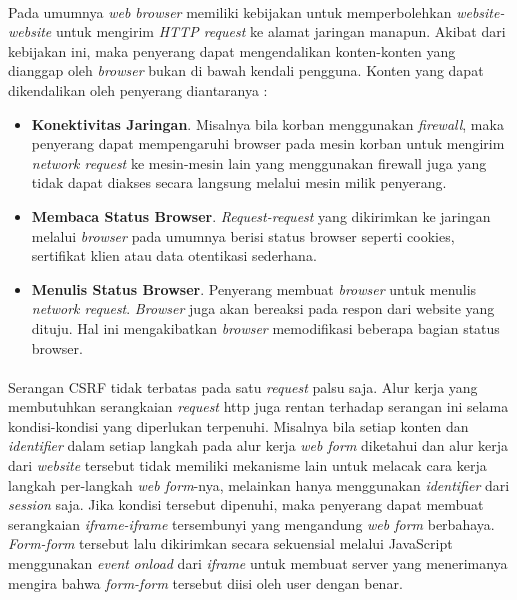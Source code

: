 \paragraph{}Pada umumnya \textit{web browser} memiliki kebijakan untuk memperbolehkan \textit{website-website} untuk mengirim \textit{HTTP request} ke alamat jaringan manapun. Akibat dari kebijakan ini, maka penyerang dapat mengendalikan konten-konten yang dianggap oleh \textit{browser} bukan di bawah kendali pengguna. Konten yang dapat dikendalikan oleh penyerang diantaranya :
\begin{itemize}
	\item \textbf{Konektivitas Jaringan}. Misalnya bila korban menggunakan \textit{firewall}, maka penyerang dapat mempengaruhi browser pada mesin korban untuk mengirim \textit{network request} ke mesin-mesin lain yang menggunakan firewall juga yang tidak dapat diakses secara langsung melalui mesin milik penyerang.
	\item \textbf{Membaca Status Browser}. \textit{Request-request} yang dikirimkan ke jaringan melalui \textit{browser} pada umumnya berisi status browser seperti cookies, sertifikat klien atau data otentikasi sederhana.
	\item\textbf{ Menulis Status Browser}. Penyerang membuat \textit{browser} untuk menulis \textit{network request}. \textit{Browser} juga akan bereaksi pada respon dari website yang dituju. Hal ini mengakibatkan \textit{browser} memodifikasi beberapa bagian status browser.
\end{itemize}

\paragraph{}Serangan CSRF tidak terbatas pada satu \textit{request} palsu saja. Alur kerja yang membutuhkan serangkaian \textit{request} http juga rentan terhadap serangan ini selama kondisi-kondisi yang diperlukan terpenuhi. Misalnya bila setiap konten dan \textit{identifier} dalam setiap langkah pada alur kerja \textit{web form} diketahui dan alur kerja dari \textit{website} tersebut tidak memiliki mekanisme lain untuk melacak cara kerja langkah per-langkah \textit{web form}-nya, melainkan hanya menggunakan \textit{identifier} dari \textit{session} saja. Jika kondisi tersebut dipenuhi, maka penyerang dapat membuat serangkaian \textit{iframe-iframe} tersembunyi yang mengandung \textit{web form} berbahaya. \textit{Form-form} tersebut lalu dikirimkan secara sekuensial melalui JavaScript menggunakan \textit{event} \textit{onload} dari \textit{iframe} untuk membuat server yang menerimanya mengira bahwa \textit{form-form} tersebut diisi oleh user dengan benar.

